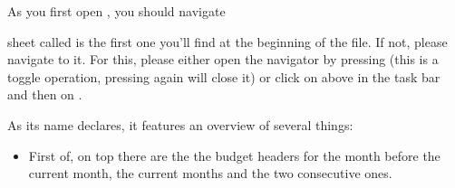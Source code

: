 As you first open \tfn, you should navigate 

sheet called  is the first one you'll find at the beginning of the file.
If not, please navigate to it.
For this, please either open the navigator by pressing  (this is a toggle operation, pressing  again will close it) or click on  above in the task bar and then on .

As its name declares, it features an overview of several things:
\begin{itemize}
	\item First of, on top there are the the budget headers for the month before the current month, the current months and the two consecutive ones.
\end{itemize}


